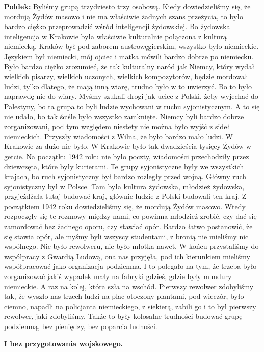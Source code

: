 \textbf{Poldek:} Byliśmy grupą trzydziesto trzy osobową. Kiedy dowiedzieliśmy się, że mordują Żydów masowo i nie ma właściwie żadnych szans przeżycia, to było bardzo ciężko przeprowadzić wśród inteligencji żydowskiej. Bo żydowska inteligencja w Krakowie była właściwie kulturalnie połączona z kulturą niemiecką. Kraków był pod zaborem austrowęgierskim, wszystko było niemieckie. Językiem był niemiecki, mój ojciec i matka mówili bardzo dobrze po niemiecku. Było bardzo ciężko zrozumieć, że tak kulturalny naród jak Niemcy, który wydał wielkich pisarzy, wielkich uczonych, wielkich kompozytorów, będzie mordował ludzi, tylko dlatego, że mają inną wiarę, trudno było w to uwierzyć. Bo to było naprawdę nie do wiary. Myśmy szukali drogi jak uciec z Polski, żeby wyjechać do Palestyny, bo ta grupa to byli ludzie wychowani w ruchu syjonistycznym. A to się nie udało, bo tak ściśle było wszystko zamknięte. Niemcy byli bardzo dobrze zorganizowani, pod tym względem niestety nie można było wyjść z sideł niemieckich. Przyszły wiadomości z Wilna, że było bardzo mało ludzi. W Krakowie za dużo nie było. W Krakowie było tak dwadzieścia tysięcy Żydów w getcie. Na początku 1942 roku nie było poczty, wiadomości przechodziły przez dziewczęta, które były kurierami. Te grupy syjonistyczne były we wszystkich krajach, bo ruch syjonistyczny był bardzo rozległy przed wojną. Główny ruch syjonistyczny był w Polsce. Tam była kultura żydowska, młodzież żydowska, przyjeżdżała tutaj budować kraj, głównie ludzie z Polski budowali ten kraj. Z początkiem 1942 roku dowiedzieliśmy się, że mordują Żydów masowo. Wtedy rozpoczęły się te rozmowy między nami, co powinna młodzież zrobić, czy dać się zamordować bez żadnego oporu, czy stawiać opór. Bardzo łatwo postanowić, że się stawia opór, ale myśmy byli wszyscy studentami, z bronią nie mieliśmy nic wspólnego. Nie było rewolweru, nie było młotka nawet. W końcu przystaliśmy do współpracy z Gwardią Ludową, ona nas przyjęła, pod ich kierunkiem mieliśmy współpracować jako organizacja podziemna. I to polegało na tym, że trzeba było zorganizować jakiś wypadek mały na fabryki gdzieś, gdzie były mundury niemieckie. A raz na kolej, która szła na wschód. Pierwszy rewolwer zdobyliśmy tak, że wyszło nas trzech ludzi na plac otoczony plantami, pod wieczór, było ciemno, napadli na policjanta niemieckiego, z siekierą, zabili go i to był pierwszy rewolwer, jaki zdobyliśmy. Także to były kolosalne trudności budować grupę podziemną, bez pieniędzy, bez poparcia ludności.\par
\textbf{I bez przygotowania wojskowego.}\par
